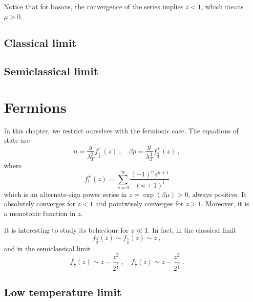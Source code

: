     Notice that for bosons, the convergence of the series implies $z < 1$, which means $\mu > 0$.

\section{Classical limit}

\section{Semiclassical limit}

\chapter{Fermions}

    In this chapter, we restrict ourselves with the fermionic case. The equations of state are 
    \begin{equation*}
        n = \frac{g}{\lambda_T^3} f_{\frac{3}{2}}^+ (z) ~, \quad \beta p = \frac{g}{\lambda_T^3} f_{\frac{5}{2}}^+ (z) ~,
    \end{equation*}
    where 
    \begin{equation*}
        f_l^+ (z) = \sum_{n=0}^\infty \frac{(-1)^n z^{n+1}}{(n+1)^l}
    \end{equation*}
    which is an alternate-sign power series in $z = \exp(\beta\mu) > 0$, always positive. It absolutely converges for $z < 1$ and pointwisely converges for $z > 1$. Moreover, it is a monotonic function in $z$. 

    It is interesting to study its behaviour for $z \ll 1$. In fact, in the classical limit
    \begin{equation*}
        f_{\frac{3}{2}}(z) \sim f_{\frac{5}{2}}(z) \sim z  ~,
    \end{equation*}
    and in the semiclassical limit 
    \begin{equation*}
        f_{\frac{3}{2}}(z) \sim z - \frac{z^2}{2^{\frac{3}{2}}} ~, \quad f_{\frac{5}{2}}(z) \sim z - \frac{z^2}{2^{\frac{5}{2}}}  ~.
    \end{equation*}

\section{Low temperature limit}


